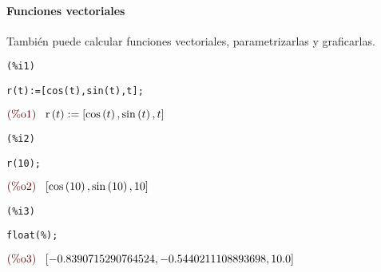 \documentclass[12pt]{article}
\begin{document}
\paragraph{Funciones vectoriales} También puede calcular funciones vectoriales, parametrizarlas y graficarlas.

\noindent
\begin{minipage}[t]{8ex}{\color{red}\bf
\begin{verbatim}
(%i1) 
\end{verbatim}}
\end{minipage}
\begin{minipage}[t]{\textwidth}{\color{blue}
\begin{verbatim}
r(t):=[cos(t),sin(t),t];
\end{verbatim}}
\end{minipage}
\begin{math}\displaystyle
\parbox{8ex}{\color{labelcolor}(\%o1) }
\mathrm{r}\left( t\right) :=[\mathrm{cos}\left( t\right) ,\mathrm{sin}\left( t\right) ,t]
\end{math}

\noindent
\begin{minipage}[t]{8ex}{\color{red}\bf
\begin{verbatim}
(%i2) 
\end{verbatim}}
\end{minipage}
\begin{minipage}[t]{\textwidth}{\color{blue}
\begin{verbatim}
r(10);
\end{verbatim}}
\end{minipage}
\begin{math}\displaystyle
\parbox{8ex}{\color{labelcolor}(\%o2) }
[\mathrm{cos}\left( 10\right) ,\mathrm{sin}\left( 10\right) ,10]
\end{math}

\noindent
\begin{minipage}[t]{8ex}{\color{red}\bf
\begin{verbatim}
(%i3) 
\end{verbatim}}
\end{minipage}
\begin{minipage}[t]{\textwidth}{\color{blue}
\begin{verbatim}
float(%);
\end{verbatim}}
\end{minipage}
\begin{math}\displaystyle
\parbox{8ex}{\color{labelcolor}(\%o3) }
[-0.8390715290764524,-0.5440211108893698,10.0]
\end{math}
\end{document}
